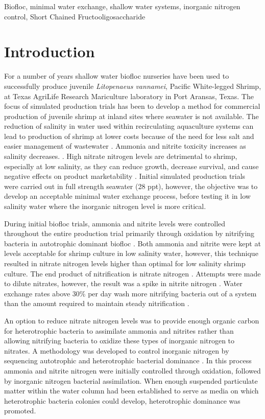 \documentclass[useAMS,usenatbib]{tellus}
\begin{document}
\begin{keywords}
Biofloc, minimal water exchange, shallow water systems, inorganic nitrogen control, Short Chained Fructooligosaccharide \end{keywords}

\section{Introduction}
\vspace*{-1pt}
\noindent For a number of years shallow water biofloc nurseries have been used to successfully produce juvenile \textit{Litopenaeus vannamei}, Pacific White-legged Shrimp, at Texas AgriLife Research Mariculture laboratory in Port Aransas, Texas. The focus of simulated production trials has been to develop a method for commercial production of juvenile shrimp at inland sites where seawater is not available. The reduction of salinity in water used within recirculating aquaculture systems can lead to production of shrimp at lower costs because of the need for less salt and easier management of wastewater \citep{sch+al2010}. Ammonia and nitrite toxicity increases as salinity decreases. \citep{linche2001, linche2003}. High nitrate nitrogen levels are detrimental to shrimp, especially at low salinity, as they can reduce growth, decrease survival, and cause negative effects on product marketability \citep{kuhn+al2010}. Initial simulated production trials were carried out in full strength seawater (28 ppt), however, the objective was to develop an acceptable minimal water exchange process, before testing it in low salinity water where the inorganic nitrogen level is more critical. 

During initial biofloc trials, ammonia and nitrite levels were controlled throughout the entire production trial primarily through oxidation by nitrifying bacteria in autotrophic dominant biofloc \citep{cro+al2012}.  Both ammonia and nitrite were kept at levels acceptable for shrimp culture in low salinity water, however, this technique resulted in nitrate nitrogen levels higher than optimal for low salinity shrimp culture. The end product of nitrification is nitrate nitrogen \citep{ritmcc2001}. Attempts were made to dilute nitrates, however, the result was a spike in nitrite nitrogen \citep{cro+al2012}. Water exchange rates above 30\% per day wash more nitrifying bacteria out of a system than the amount required to maintain steady nitrification \citep{avn2009}.

An option to reduce nitrate nitrogen levels was to provide enough organic carbon for heterotrophic bacteria to assimilate ammonia and nitrites rather than allowing nitrifying bacteria to oxidize these types of inorganic nitrogen to nitrates. A methodology was developed to control inorganic nitrogen by sequencing autotrophic and heterotrophic bacterial dominance \citep{cro+al2013}. In this process ammonia and nitrite nitrogen were initially controlled through oxidation, followed by inorganic nitrogen bacterial assimilation.  When enough suspended particulate matter within the water column had been established to serve as media on which heterotrophic bacteria colonies could develop, heterotrophic dominance was promoted. 
\end{document}
